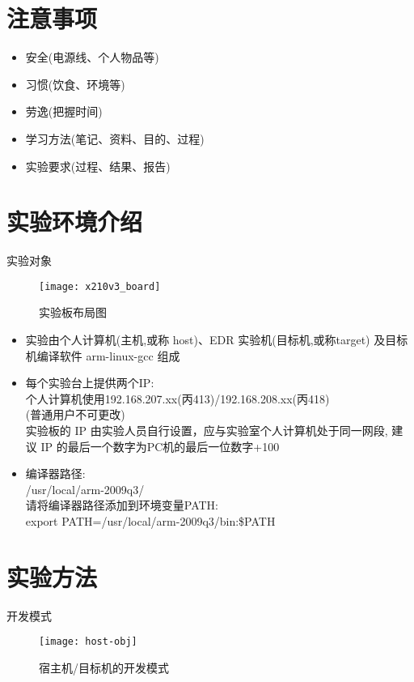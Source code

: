 \chapter{注意事项}{}
\begin{itemize}
  \item 安全(电源线、个人物品等)
  \item 习惯(饮食、环境等)
  \item 劳逸(把握时间)
  \item 学习方法(笔记、资料、目的、过程)
  \item 实验要求(过程、结果、报告)
\end{itemize}
\endslide

\chapter{实验环境介绍}{实验对象}
\begin{figure}
\centering
  \texttt{[image: x210v3\_board]}
\caption{实验板布局图}
\end{figure}
\endslide

\begin{itemize}
  \item 实验由个人计算机(主机,或称 host)、EDR 实验机(目标机,或称target)
		及目标机编译软件 arm-linux-gcc 组成
  \item 每个实验台上提供两个IP:\\
        个人计算机使用192.168.207.xx(丙413)/192.168.208.xx(丙418)\\
		(普通用户不可更改)\\
		实验板的 IP 由实验人员自行设置，应与实验室个人计算机处于同一网段,
        建议 IP 的最后一个数字为PC机的最后一位数字+100
  \item 编译器路径:\\
        /usr/local/arm-2009q3/\\
		请将编译器路径添加到环境变量PATH:\\
		export PATH=/usr/local/arm-2009q3/bin:\$PATH
\end{itemize}
\endslide

\chapter{实验方法}{开发模式}
\begin{figure}
\centering
  \texttt{[image: host-obj]}
\caption{宿主机/目标机的开发模式}
\end{figure}

